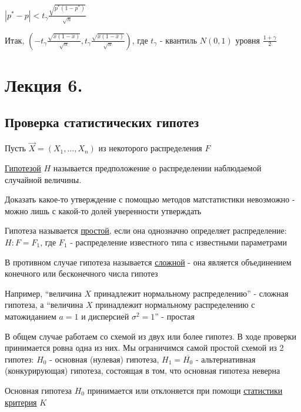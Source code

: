 \documentclass[12pt]{article}
\begin{document}
$|p^* - p| < t_\gamma \frac{\sqrt{p^* (1 - p^*)}}{\sqrt{n}}$

Итак, $\left(-t_\gamma \frac{\sqrt{\overline{x} (1 - \overline{x})}}{\sqrt{n}}, t_\gamma \frac{\sqrt{\overline{x} (1 - \overline{x})}}{\sqrt{n}}\right)$, где $t_\gamma$ - квантиль $N(0, 1)$ уровня $\frac{1 + \gamma}{2}$










\section{Лекция 6.}

\subsection{Проверка статистических гипотез}

\hypertarget{hypothesis}{}

Пусть $\vec X = (X_1, \dots, X_n)$ из некоторого распределения $F$

\Def \underline{Гипотезой} $H$ называется предположение о распределении наблюдаемой случайной величины. 

Доказать какое-то утверждение с помощью методов матстатистики невозможно - можно лишь с какой-то долей 
уверенности утверждать

\Def Гипотеза называется \underline{простой}, если она однозначно определяет распределение: 
$H : F = F_1$, где $F_1$ - распределение известного типа с известными параметрами

В противном случае гипотеза называется \underline{сложной} - она является объединением конечного или бесконечного числа
гипотез

Например, \enquote{величина $X$ принадлежит нормальному распределению} - сложная гипотеза, а 
\enquote{величина $X$ принадлежит нормальному распределению с матожиданием $a = 1$ и дисперсией $\sigma^2 = 1$} - простая


В общем случае работаем со схемой из двух или более гипотез. В ходе проверки принимается ровна одна из них.
Мы ограничимся самой простой схемой из 2 гипотез: $H_0$ - основная (нулевая) гипотеза, $H_1 = \overline{H_0}$ - 
альтернативная (конкурирующая) гипотеза, состоящая в том, что основная гипотеза неверна

Основная гипотеза $H_0$ принимается или отклоняется при помощи \underline{статистики критерия} $K$ 
\end{document}

